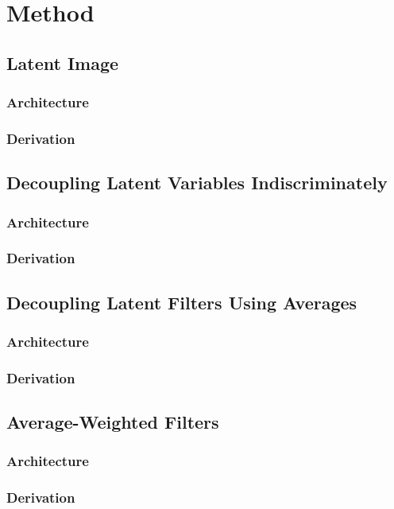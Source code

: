 \chapter{Method}

\label{ch:method}

\section{Latent Image}
\lipsum[2]
\subsection{Architecture}
\subsection{Derivation}

\section{Decoupling Latent Variables Indiscriminately}
\lipsum[2]
\subsection{Architecture}
\subsection{Derivation}

\section{Decoupling Latent Filters Using Averages}
\lipsum[2]
\subsection{Architecture}
\subsection{Derivation}

\section{Average-Weighted Filters}
\lipsum[2]
\subsection{Architecture}
\subsection{Derivation}

